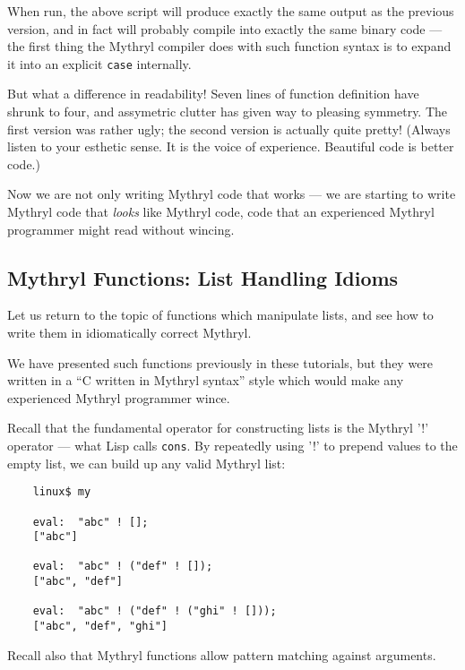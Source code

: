 When run, the above script will produce exactly the same output as the 
previous version, and in fact will probably compile into exactly the 
same binary code --- the first thing the Mythryl compiler does with such 
function syntax is to expand it into an explicit {\tt case} internally.

But what a difference in readability!  Seven lines of function definition 
have shrunk to four, and assymetric clutter has given way to pleasing 
symmetry.  The first version was rather ugly;  the second version is 
actually quite pretty!  (Always listen to your esthetic sense.  It is 
the voice of experience.  Beautiful code is better code.)

Now we are not only writing Mythryl code that works --- we are starting 
to write Mythryl code that {\it looks} like Mythryl code, code that an 
experienced Mythryl programmer might read without wincing.

\cutend*

\subsection{Mythryl Functions:  List Handling Idioms}

Let us return to the topic of functions which manipulate lists, and see 
how to write them in idiomatically correct Mythryl.

We have presented such functions previously in these tutorials, but 
they were written in a ``C written in Mythryl syntax'' style which 
would make any experienced Mythryl programmer wince.

Recall that the fundamental operator for constructing lists is the 
Mythryl '!' operator --- what Lisp calls {\tt cons}.  By repeatedly 
using '!' to prepend values to the empty list, we can build up any 
valid Mythryl list:

\begin{verbatim}
    linux$ my

    eval:  "abc" ! [];
    ["abc"]

    eval:  "abc" ! ("def" ! []);
    ["abc", "def"]

    eval:  "abc" ! ("def" ! ("ghi" ! []));
    ["abc", "def", "ghi"]
\end{verbatim}

Recall also that Mythryl functions allow pattern matching against 
arguments.

